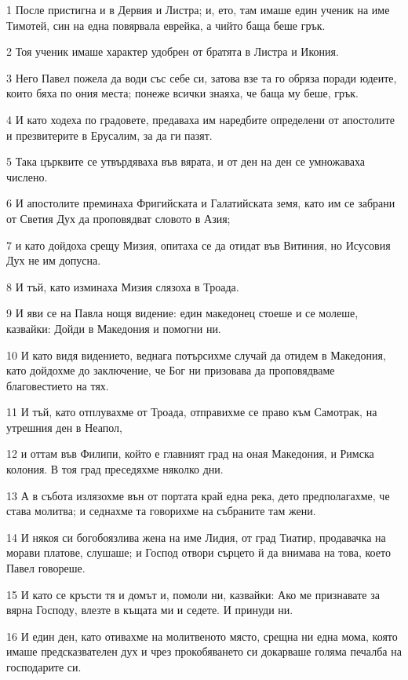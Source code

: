 \par 1 После пристигна и в Дервия и Листра; и, ето, там имаше един ученик на име Тимотей, син на една повярвала еврейка, а чийто баща беше грък.
\par 2 Тоя ученик имаше характер удобрен от братята в Листра и Икония.
\par 3 Него Павел пожела да води със себе си, затова взе та го обряза поради юдеите, които бяха по ония места; понеже всички знаяха, че баща му беше, грък.
\par 4 И като ходеха по градовете, предаваха им наредбите определени от апостолите и презвитерите в Ерусалим, за да ги пазят.
\par 5 Така църквите се утвърдяваха във вярата, и от ден на ден се умножаваха числено.
\par 6 И апостолите преминаха Фригийската и Галатийската земя, като им се забрани от Светия Дух да проповядват словото в Азия;
\par 7 и като дойдоха срещу Мизия, опитаха се да отидат във Витиния, но Исусовия Дух не им допусна.
\par 8 И тъй, като изминаха Мизия слязоха в Троада.
\par 9 И яви се на Павла нощя видение: един македонец стоеше и се молеше, казвайки: Дойди в Македония и помогни ни.
\par 10 И като видя видението, веднага потърсихме случай да отидем в Македония, като дойдохме до заключение, че Бог ни призовава да проповядваме благовестието на тях.
\par 11 И тъй, като отплувахме от Троада, отправихме се право към Самотрак, на утрешния ден в Неапол,
\par 12 и оттам във Филипи, който е главният град на оная Македония, и Римска колония. В тоя град преседяхме няколко дни.
\par 13 А в събота излязохме вън от портата край една река, дето предполагахме, че става молитва; и седнахме та говорихме на събраните там жени.
\par 14 И някоя си богобоязлива жена на име Лидия, от град Тиатир, продавачка на морави платове, слушаше; и Господ отвори сърцето й да внимава на това, което Павел говореше.
\par 15 И като се кръсти тя и домът и, помоли ни, казвайки: Ако ме признавате за вярна Господу, влезте в къщата ми и седете. И принуди ни.
\par 16 И един ден, като отивахме на молитвеното място, срещна ни една мома, която имаше предсказвателен дух и чрез прокобяването си докарваше голяма печалба на господарите си.
